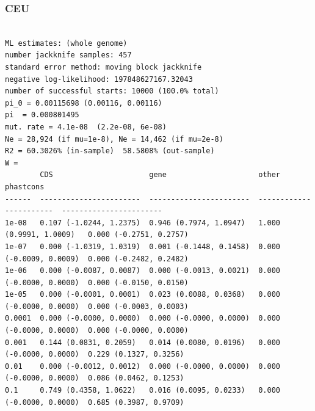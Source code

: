 \documentclass[11pt]{article}
\begin{document}
\subsubsection*{CEU}
\begin{minipage}{\linewidth}\begin{footnotesize}
\begin{verbatim}

ML estimates: (whole genome)
number jackknife samples: 457
standard error method: moving block jackknife
negative log-likelihood: 197848627167.32043
number of successful starts: 10000 (100.0% total)
pi_0 = 0.00115698 (0.00116, 0.00116)
pi  = 0.000801495
mut. rate = 4.1e-08  (2.2e-08, 6e-08)
Ne = 28,924 (if mu=1e-8), Ne = 14,462 (if mu=2e-8)
R2 = 60.3026% (in-sample)  58.5808% (out-sample)
W = 
        CDS                      gene                     other                    phastcons
------  -----------------------  -----------------------  -----------------------  -----------------------
1e-08   0.107 (-1.0244, 1.2375)  0.946 (0.7974, 1.0947)   1.000 (0.9991, 1.0009)   0.000 (-0.2751, 0.2757)
1e-07   0.000 (-1.0319, 1.0319)  0.001 (-0.1448, 0.1458)  0.000 (-0.0009, 0.0009)  0.000 (-0.2482, 0.2482)
1e-06   0.000 (-0.0087, 0.0087)  0.000 (-0.0013, 0.0021)  0.000 (-0.0000, 0.0000)  0.000 (-0.0150, 0.0150)
1e-05   0.000 (-0.0001, 0.0001)  0.023 (0.0088, 0.0368)   0.000 (-0.0000, 0.0000)  0.000 (-0.0003, 0.0003)
0.0001  0.000 (-0.0000, 0.0000)  0.000 (-0.0000, 0.0000)  0.000 (-0.0000, 0.0000)  0.000 (-0.0000, 0.0000)
0.001   0.144 (0.0831, 0.2059)   0.014 (0.0080, 0.0196)   0.000 (-0.0000, 0.0000)  0.229 (0.1327, 0.3256)
0.01    0.000 (-0.0012, 0.0012)  0.000 (-0.0000, 0.0000)  0.000 (-0.0000, 0.0000)  0.086 (0.0462, 0.1253)
0.1     0.749 (0.4358, 1.0622)   0.016 (0.0095, 0.0233)   0.000 (-0.0000, 0.0000)  0.685 (0.3987, 0.9709)
\end{verbatim}
\end{footnotesize}\end{minipage}
\end{document}
